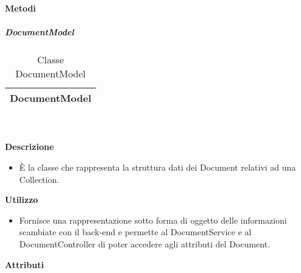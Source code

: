 		\textbf{Metodi} 
	\begin{itemize}
		\end{itemize}
			\subparagraph{DocumentModel} 
\begin{table}[ht]
\begin{center}
\bgroup
	\setlength{\arrayrulewidth}{0.6mm}
	\def\arraystretch{1}
		\begin{tabular}{ | p{12cm} | }
				\hline  
					\centerline{\textbf{DocumentModel}}
		\\ \hline 
				\hline
				\hline
		
		\end{tabular}
\egroup
\caption{Classe DocumentModel}
\end{center}
\end{table}  \textbf{\\ \\ Descrizione} 
					\begin{itemize}
						\item[] È la classe che rappresenta la struttura dati dei Document relativi ad una Collection.
					\end{itemize}      
				\textbf{Utilizzo}  
					\begin{itemize}
						\item[] Fornisce una rappresentazione sotto forma di oggetto delle informazioni scambiate con il back-end e permette al DocumentService e al DocumentController di poter accedere agli attributi del Document.
					\end{itemize}
			 \textbf{Attributi} 
	\begin{itemize}
		\end{itemize}
		
